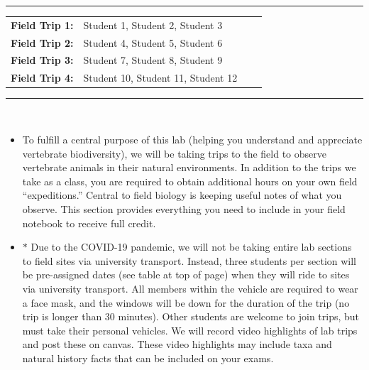 \documentclass[11pt, a4paper]{article}
\begin{document}
\pagestyle{fancyplain}
\fancyhf{}
\thispagestyle{plain}

\begin{center}
\begin{singlespace}
\rule{6in}{0.4pt}
\begin{minipage}[t]{.75\textwidth}
\begin{tabular}{llll}
\textbf{Field Trip 1:} & Student 1,  Student 2,  Student 3 \\ \textbf{Field Trip 2:} & Student 4,  Student 5,  Student 6 \\ \textbf{Field Trip 3:} & Student 7,  Student 8,  Student 9 \\ \textbf{Field Trip 4:} & Student 10, Student 11, Student 12
\end{tabular}
\end{minipage}
\rule{6in}{0.4pt}
\end{singlespace}
\end{center}
\vspace{.5cm}
\setlength{\unitlength}{1in}
\renewcommand{\arraystretch}{2}


\justify
{}\\ %
\begin{itemize}
\item{To fulfill a central purpose of this lab (helping you understand and appreciate vertebrate biodiversity), we will be taking trips to the field to observe vertebrate animals in their natural environments. In addition to the trips we take as a class, you are required to obtain additional hours on your own field ``expeditions.'' Central to field biology is keeping useful notes of what you observe. This section provides everything you need to include in your field notebook to receive full credit.}
\item{$*$ Due to the COVID-19 pandemic, we will not be taking entire lab sections to field sites via university transport. Instead, three students per section will be pre-assigned dates (see table at top of page) when they will ride to sites via university transport. All members within the vehicle are required to wear a face mask, and the windows will be down for the duration of the trip (no trip is longer than 30 minutes). Other students are welcome to join trips, but must take their personal vehicles. We will record video highlights of lab trips and post these on canvas. These video highlights may include taxa and natural history facts that can be included on your exams.}
\end{itemize}
\end{document}
